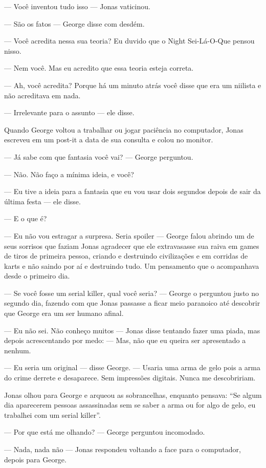--- Você inventou tudo isso --- Jonas vaticinou.

--- São os fatos --- George disse com desdém.

--- Você acredita nessa sua teoria? Eu duvido que o Night Sei-Lá-O-Que pensou nisso.

--- Nem você. Mas eu acredito que essa teoria esteja correta.

--- Ah, você acredita? Porque há um minuto atrás você disse que era um niilista e não acreditava em nada.

--- Irrelevante para o assunto --- ele disse.

Quando George voltou a trabalhar ou jogar paciência no computador, Jonas escreveu em um post-it a data de sua consulta e colou no monitor.

--- Já sabe com que fantasia você vai? --- George perguntou.

--- Não. Não faço a mínima ideia, e você?

--- Eu tive a ideia para a fantasia que eu vou usar dois segundos depois de sair da última festa --- ele disse.

--- E o que é?

--- Eu não vou estragar a surpresa. Seria spoiler --- George falou abrindo um de seus sorrisos que faziam Jonas agradecer que ele extravasasse sua raiva em games de tiros de primeira pessoa, criando e destruindo civilizações e em corridas de karts e não saindo por aí e destruindo tudo. Um pensamento que o acompanhava desde o primeiro dia.

--- Se você fosse um serial killer, qual você seria? --- George o perguntou justo no segundo dia, fazendo com que Jonas passasse a ficar meio paranoico até descobrir que George era um ser humano afinal.

--- Eu não sei. Não conheço muitos --- Jonas disse tentando fazer uma piada, mas depois acrescentando por medo: --- Mas, não que eu queira ser apresentado a nenhum.

--- Eu seria um original --- disse George. --- Usaria uma arma de gelo pois a arma do crime derrete e desaparece. Sem impressões digitais. Nunca me descobririam.

Jonas olhou para George e arqueou as sobrancelhas, enquanto pensava: ``Se algum dia aparecerem pessoas assassinadas sem se saber a arma ou for algo de gelo, eu trabalhei com um serial killer''.

--- Por que está me olhando? --- George perguntou incomodado.

--- Nada, nada não --- Jonas respondeu voltando a face para o computador, depois para George.


